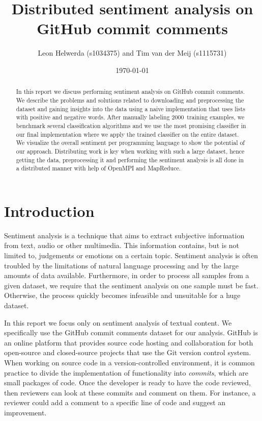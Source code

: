 \documentclass{article}
\begin{document}
\title{Distributed sentiment analysis on GitHub commit comments}
\author{Leon Helwerda (s1034375) and Tim van der Meij (s1115731)}
\date{\today}
\maketitle

\begin{abstract}
  In this report we discuss performing sentiment analysis on GitHub commit
  comments. We describe the problems and solutions related to downloading and
  preprocessing the dataset and gaining insights into the data using a naive
  implementation that uses lists with positive and negative words. After
  manually labeling 2000~training examples, we benchmark several classification
  algorithms and we use the most promising classifier in our final
  implementation where we apply the trained classifier on the entire dataset.
  We visualize the overall sentiment per programming language to show the
  potential of our approach. Distributing work is key when working with such a
  large dataset, hence getting the data, preprocessing it and performing the
  sentiment analysis is all done in a distributed manner with help of OpenMPI
  and MapReduce.
\end{abstract}

\section{Introduction}\label{sec:introduction}
Sentiment analysis is a technique that aims to extract subjective information
from text, audio or other multimedia. This information contains, but is not
limited to, judgements or emotions on a certain topic. Sentiment analysis is
often troubled by the limitations of natural language processing and by the
large amounts of data available. Furthermore, in order to process all samples 
from a given dataset, we require that the sentiment analysis on one sample must 
be fast. Otherwise, the process quickly becomes infeasible and unsuitable for a
huge dataset.

In this report we focus only on sentiment analysis of textual content. We 
specifically use the GitHub commit comments dataset for our analysis. GitHub is 
an online platform that provides source code hosting and collaboration for both 
open-source and closed-source projects that use the Git version control system. 
When working on source code in a version-controlled environment, it is common 
practice to divide the implementation of functionality into \emph{commits}, 
which are small packages of code. Once the developer is ready to have the code 
reviewed, then reviewers can look at these commits and comment on them. For 
instance, a reviewer could add a comment to a specific line of code and suggest 
an improvement.
\end{document}
